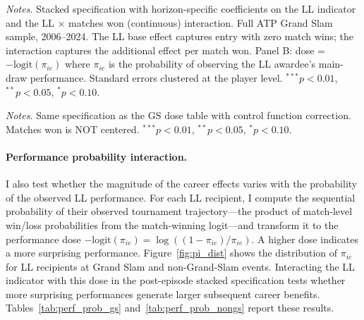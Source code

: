 \begin{table}[htbp]
\centering
\caption{Treatment Dose: LL Base Effect and LL $\times$ Matches Won Interaction (Stacked)}
\label{tab:dose}
\begin{threeparttable}
\small

\begin{tablenotes}
\footnotesize
\item \textit{Notes.} Stacked specification with horizon-specific coefficients on the LL indicator and the LL $\times$ matches won (continuous) interaction. Full ATP Grand Slam sample, 2006--2024. The LL base effect captures entry with zero match wins; the interaction captures the additional effect per match won. Panel B: dose = $-\text{logit}(\pi_{ie})$ where $\pi_{ie}$ is the probability of observing the LL awardee's main-draw performance. Standard errors clustered at the player level. $^{***}p<0.01$, $^{**}p<0.05$, $^{*}p<0.10$.
\end{tablenotes}
\end{threeparttable}
\end{table}


\begin{table}[htbp]
\centering
\caption{Treatment Dose: Non-Grand-Slam (Stacked)}
\label{tab:dose_nongs}
\begin{threeparttable}
\small

\begin{tablenotes}
\footnotesize
\item \textit{Notes.} Same specification as the GS dose table with control function correction. Matches won is NOT centered. $^{***}p<0.01$, $^{**}p<0.05$, $^{*}p<0.10$.
\end{tablenotes}
\end{threeparttable}
\end{table}

\paragraph{Performance probability interaction.} I also test whether the magnitude of the career effects varies with the probability of the observed LL performance. For each LL recipient, I compute the sequential probability of their observed tournament trajectory---the product of match-level win/loss probabilities from the match-winning logit---and transform it to the performance dose $-\text{logit}(\pi_{ie}) = \log((1 - \pi_{ie})/\pi_{ie})$. A higher dose indicates a more surprising performance. Figure~\ref{fig:pi_dist} shows the distribution of $\pi_{ie}$ for LL recipients at Grand Slam and non-Grand-Slam events. Interacting the LL indicator with this dose in the post-episode stacked specification tests whether more surprising performances generate larger subsequent career benefits. Tables~\ref{tab:perf_prob_gs} and~\ref{tab:perf_prob_nongs} report these results.

